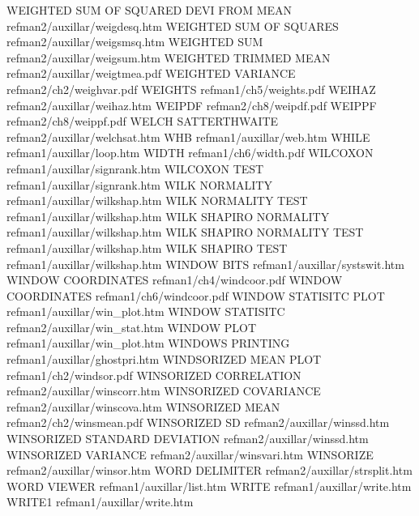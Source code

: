 WEIGHTED SUM OF SQUARED DEVI FROM MEAN  refman2/auxillar/weigdesq.htm
WEIGHTED SUM OF SQUARES                 refman2/auxillar/weigsmsq.htm
WEIGHTED SUM                            refman2/auxillar/weigsum.htm
WEIGHTED TRIMMED MEAN                   refman2/auxillar/weigtmea.pdf
WEIGHTED VARIANCE                       refman2/ch2/weighvar.pdf
WEIGHTS                                 refman1/ch5/weights.pdf
WEIHAZ                                  refman2/auxillar/weihaz.htm
WEIPDF                                  refman2/ch8/weipdf.pdf
WEIPPF                                  refman2/ch8/weippf.pdf
WELCH SATTERTHWAITE                     refman2/auxillar/welchsat.htm
WHB                                     refman1/auxillar/web.htm
WHILE                                   refman1/auxillar/loop.htm
WIDTH                                   refman1/ch6/width.pdf
WILCOXON                                refman1/auxillar/signrank.htm
WILCOXON TEST                           refman1/auxillar/signrank.htm
WILK NORMALITY                          refman1/auxillar/wilkshap.htm
WILK NORMALITY TEST                     refman1/auxillar/wilkshap.htm
WILK SHAPIRO NORMALITY                  refman1/auxillar/wilkshap.htm
WILK SHAPIRO NORMALITY TEST             refman1/auxillar/wilkshap.htm
WILK SHAPIRO TEST                       refman1/auxillar/wilkshap.htm
WINDOW BITS                             refman1/auxillar/systswit.htm
WINDOW COORDINATES                      refman1/ch4/windcoor.pdf
WINDOW COORDINATES                      refman1/ch6/windcoor.pdf
WINDOW STATISITC PLOT                   refman1/auxillar/win_plot.htm
WINDOW STATISITC                        refman2/auxillar/win_stat.htm
WINDOW PLOT                             refman1/auxillar/win_plot.htm
WINDOWS PRINTING                        refman1/auxillar/ghostpri.htm
WINDSORIZED MEAN PLOT                   refman1/ch2/windsor.pdf
WINSORIZED CORRELATION                  refman2/auxillar/winscorr.htm
WINSORIZED COVARIANCE                   refman2/auxillar/winscova.htm
WINSORIZED MEAN                         refman2/ch2/winsmean.pdf
WINSORIZED SD                           refman2/auxillar/winssd.htm
WINSORIZED STANDARD DEVIATION           refman2/auxillar/winssd.htm
WINSORIZED VARIANCE                     refman2/auxillar/winsvari.htm
WINSORIZE                               refman2/auxillar/winsor.htm
WORD DELIMITER                          refman2/auxillar/strsplit.htm
WORD VIEWER                             refman1/auxillar/list.htm
WRITE                                   refman1/auxillar/write.htm
WRITE1                                  refman1/auxillar/write.htm
